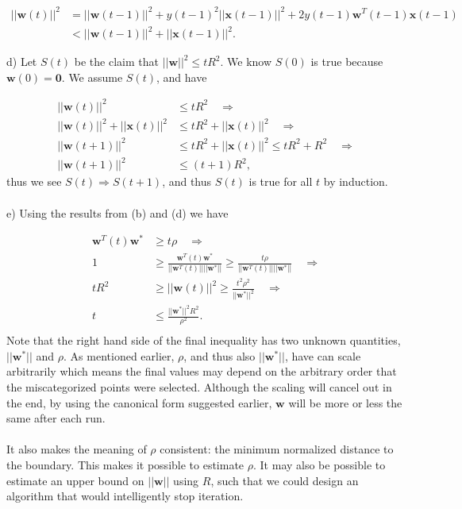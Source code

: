 \documentclass[11pt,letterpaper]{article}
\newcommand{\vv}[1]{\mathbf{#1}} %
\begin{document}
\begin{align*}
    ||\vv{w}(t)||^2 &= ||\vv{w}(t - 1)||^2 + y(t-1)^2||\vv{x}(t - 1)||^2 + 2 y(t-1)\vv{w}^T(t - 1)\vv{x}(t-1) \\
    &< ||\vv{w}(t - 1)||^2 + ||\vv{x}(t-1)||^2.
\end{align*}

d) Let $S(t)$ be the claim that $||\vv{w}||^2 \le tR^2$.  We know $S(0)$ is true because $\vv{w}(0) = \vv{0}$.  We assume $S(t)$, and have

\begin{align*}
    ||\vv{w}(t)||^2 &\le tR^2 \quad \Longrightarrow \\
    ||\vv{w}(t)||^2 + ||\vv{x}(t)||^2 &\le tR^2 + ||\vv{x}(t)||^2 \quad \Longrightarrow \\
    ||\vv{w}(t + 1)||^2 &\le tR^2 + ||\vv{x}(t)||^2 \le tR^2 + R^2 \quad \Longrightarrow \\
    ||\vv{w}(t + 1)||^2 &\le (t + 1)R^2,
\end{align*}
thus we see $S(t) \Rightarrow S(t + 1)$, and thus $S(t)$ is true for all $t$ by induction.
\\\\
e) Using the results from (b) and (d) we have

\begin{align*}
    \vv{w}^T(t)\vv{w}^* &\ge t\rho \quad \Longrightarrow \\
    1 &\ge \frac{\vv{w}^T(t)\vv{w}^*}{||\vv{w}^T(t)|| ||\vv{w}^*||} \ge \frac{t\rho}{||\vv{w}^T(t)|| ||\vv{w}^*||} \quad \Longrightarrow \\
    tR^2 &\ge ||\vv{w}(t)||^2 \ge \frac{t^2 \rho^2}{||\vv{w}^*||^2} \quad \Longrightarrow \\
    t &\le \frac{||\vv{w}^*||^2R^2}{\rho^2}. \\
\end{align*}
Note that the right hand side of the final inequality has two unknown quantities, $||\vv{w}^*||$ and $\rho$.  As mentioned earlier, $\rho$, and thus also $||\vv{w}^*||$, have can scale arbitrarily which means the final values may depend on the arbitrary order that the miscategorized points were selected.  Although the scaling will cancel out in the end, by using the canonical form suggested earlier, $\vv{w}$ will be more or less the same after each run.
\\\\
It also makes the meaning of $\rho$ consistent: the minimum normalized distance to the boundary.  This makes it possible to estimate $\rho$.  It may also be possible to estimate an upper bound on $||\vv{w}||$ using $R$, such that we could design an algorithm that would intelligently stop iteration.
\end{document}

